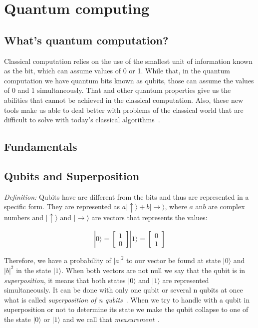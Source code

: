 \documentclass[conference]{IEEEtran}
\begin{document}
\section{Quantum computing}\label{sec:qc}
\subsection{What's quantum computation?}\label{subsec:what's-quantum-computation?}

Classical computation relies on the use of the smallest unit of information known as the bit, which can assume values of
0 or 1.
While that, in the quantum computation we have quantum bits known as qubits, those can
assume the values of 0 and 1 simultaneously.
That and other quantum properties give us the abilities that cannot be achieved in the classical computation.
Also, these new tools make us able to deal better with problems of the classical world that are difficult
to solve with today's classical algorithms~\cite{russon_2017,deutsch1992rapid}.

\subsection{Fundamentals}\label{subsec:fundamentals}

\subsection{Qubits and Superposition}\label{subsec:qubits-and-superposition}

\textit{Definition:} Qubits have are different from the bits and thus are represented in a specific form.
They are represented as \(a|\uparrow\rangle + b|\rightarrow\rangle\), where \(a\) an\(b\) are complex
numbers and \(|\uparrow\rangle\) and \(|\rightarrow\rangle\) are vectors that represents the values:

\[ |0\rangle = \begin{bmatrix} 1 \\ 0\end{bmatrix}  |1\rangle = \begin{bmatrix} 0 \\ 1\end{bmatrix}\]

Therefore, we have a probability of \(|a|^2\) to our vector be found at state \(|0\rangle \) and
\(|b|^2\) in the state \(|1\rangle\).
When both vectors are not null we say that the qubit is in \textit{superposition}, it means that both states
\(|0\rangle\) and \(|1\rangle\) are represented simultaneously.
It can be done with only one qubit or several n qubits at once what is called
\textit{superposition of n qubits}~\cite{yanofsky2008quantum,rieffel2014quantum}.
When we try to handle with a qubit in superposition or not to determine its state we make the
qubit collapse to one of the state \(|0\rangle\) or \(|1\rangle\) and we call that
\textit{measurement}~\cite{yanofsky2008quantum,rieffel2014quantum}.
\end{document}
